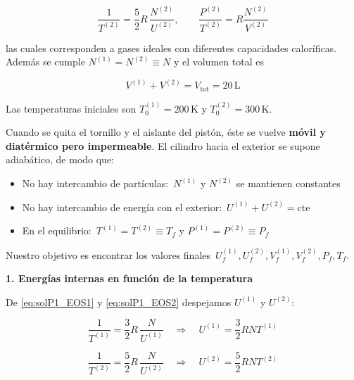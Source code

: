 \documentclass{article}
\begin{document}
\begin{equation}
\frac{1}{T^{(2)}} = \frac{5}{2}R\,\frac{N^{(2)}}{U^{(2)}},
\qquad
\frac{P^{(2)}}{T^{(2)}} = R\frac{N^{(2)}}{V^{(2)}}
\label{eq:solP1_EOS2}
\end{equation}

las cuales corresponden a gases ideales con diferentes capacidades caloríficas.
Además se cumple \(N^{(1)} = N^{(2)} \equiv N\) y el volumen total es

\[
V^{(1)} + V^{(2)} = V_{\text{tot}} = 20\,\mathrm{L}
\]

Las temperaturas iniciales son \(T^{(1)}_{0} = 200\,\mathrm{K}\) y
\(T^{(2)}_{0} = 300\,\mathrm{K}\).

Cuando se quita el tornillo y el aislante del pistón, éste se vuelve
\textcolor{Tarawera}{\textbf{móvil y diatérmico pero impermeable}}.  
El cilindro hacia el exterior se supone adiabático, de modo que:

\begin{itemize}
  \item[$\bullet$] No hay intercambio de partículas:
  \(\,N^{(1)}\) y \(N^{(2)}\) se mantienen constantes
  \item[$\bullet$] No hay intercambio de energía con el exterior:
  \(\,U^{(1)} + U^{(2)} = \text{cte}\)
  \item[$\bullet$] En el equilibrio:
  \(\,T^{(1)} = T^{(2)} \equiv T_{f}\) y \(P^{(1)} = P^{(2)} \equiv P_{f}\)
\end{itemize}

Nuestro objetivo es encontrar los valores finales
\(\,U^{(1)}_{f}, U^{(2)}_{f}, V^{(1)}_{f}, V^{(2)}_{f}, P_{f}, T_{f}\).

\vspace{0.4cm}
\noindent
\textcolor{Apple Green}{\textbf{1. Energías internas en función de la temperatura}}

De \eqref{eq:solP1_EOS1} y \eqref{eq:solP1_EOS2} despejamos \(U^{(1)}\) y \(U^{(2)}\):

\begin{equation}
\frac{1}{T^{(1)}} = \frac{3}{2}R\,\frac{N}{U^{(1)}}
\quad\Rightarrow\quad
U^{(1)} = \frac{3}{2}R N T^{(1)}
\label{eq:solP1_U1_deT}
\end{equation}

\begin{equation}
\frac{1}{T^{(2)}} = \frac{5}{2}R\,\frac{N}{U^{(2)}}
\quad\Rightarrow\quad
U^{(2)} = \frac{5}{2}R N T^{(2)}
\label{eq:solP1_U2_deT}
\end{equation}
\end{document}
